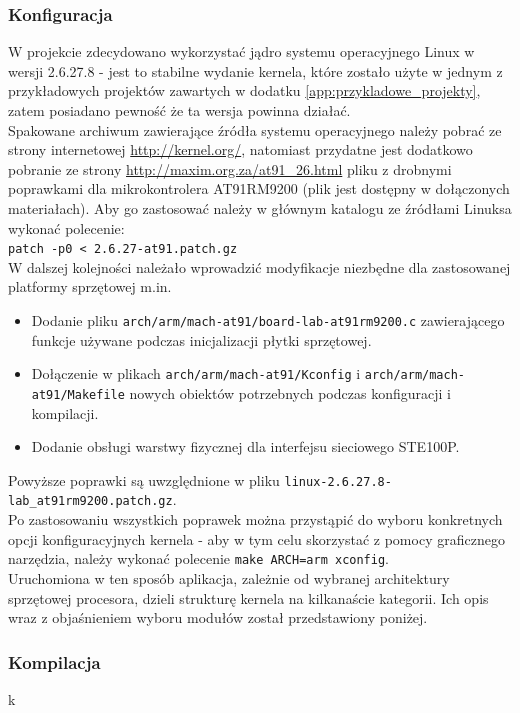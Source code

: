 \documentclass[a4paper,12pt]{book}
\begin{document}
				\subsubsection{Konfiguracja}
					W projekcie zdecydowano wykorzystać jądro systemu operacyjnego Linux w wersji 2.6.27.8 - jest to stabilne wydanie kernela, które zostało użyte w jednym z przykładowych projektów zawartych w dodatku \ref{app:przykladowe_projekty}, zatem posiadano pewność że ta wersja powinna działać.\\
					Spakowane archiwum zawierające źródła systemu operacyjnego należy pobrać ze strony internetowej \url{http://kernel.org/}, natomiast przydatne jest dodatkowo pobranie ze strony \url{http://maxim.org.za/at91_26.html} pliku z drobnymi poprawkami dla mikrokontrolera AT91RM9200 (plik jest dostępny w dołączonych materiałach). Aby go zastosować należy w głównym katalogu ze źródłami Linuksa wykonać polecenie:\\
					\texttt{patch -p0 < 2.6.27-at91.patch.gz}\\
					W dalszej kolejności należało wprowadzić modyfikacje niezbędne dla zastosowanej platformy sprzętowej m.in.
					\begin{itemize}
						\item Dodanie pliku \texttt{arch/arm/mach-at91/board-lab-at91rm9200.c} zawierającego funkcje używane podczas inicjalizacji płytki sprzętowej.
						\item Dołączenie w plikach \texttt{arch/arm/mach-at91/Kconfig} i \texttt{arch/arm/mach-at91/Makefile} nowych obiektów potrzebnych podczas konfiguracji i kompilacji.
						\item Dodanie obsługi warstwy fizycznej dla interfejsu sieciowego STE100P.
					\end{itemize}
					Powyższe poprawki są uwzględnione w pliku \texttt{linux-2.6.27.8-lab\_at91rm9200.patch.gz}.\\
					Po zastosowaniu wszystkich poprawek można przystąpić do wyboru konkretnych opcji konfiguracyjnych kernela - aby w tym celu skorzystać z pomocy graficznego narzędzia, należy wykonać polecenie \texttt{make ARCH=arm xconfig}.\\
					Uruchomiona w ten sposób aplikacja, zależnie od wybranej architektury sprzętowej procesora, dzieli strukturę kernela na kilkanaście kategorii. Ich opis wraz z objaśnieniem wyboru modułów został przedstawiony poniżej.
				\subsubsection{Kompilacja}
					k
\end{document}
